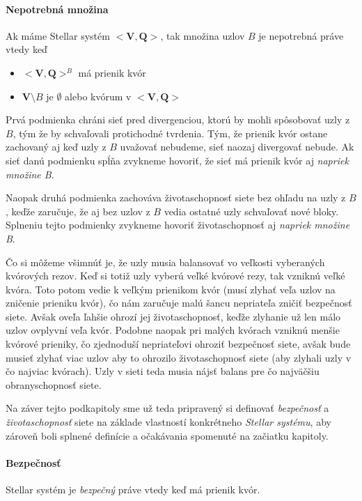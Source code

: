 \paragraph {Nepotrebná množina} Ak máme Stellar systém $<\textbf{V},
\textbf{Q}>$, tak množina uzlov $B$ je nepotrebná práve vtedy keď
\begin{itemize}
\item  $<\textbf{V}, \textbf{Q}>^B$ má prienik kvór
\item  $\textbf{V} \setminus B$ je $\pmb{\emptyset}$ alebo kvórum v $<
\textbf{V}, \textbf{Q}>$
\end{itemize}

Prvá podmienka chráni sieť pred divergenciou, ktorú by mohli spôsobovať uzly z
$B$, tým že by schvaľovali protichodné tvrdenia. Tým, že prienik kvór ostane
zachovaný aj keď uzly z $B$ uvažovať nebudeme, sieť naozaj divergovať nebude.
Ak sieť danú podmienku spĺňa zvykneme hovoriť, že sieť má prienik kvór aj
\textit{napriek množine B}.

Naopak druhá podmienka zachováva životaschopnosť siete bez ohľadu na uzly z $B$,
keďže zaručuje, že aj bez uzlov z $B$ vedia ostatné uzly schvaľovať nové bloky.
Splneniu tejto podmienky zvykneme hovoriť životaschopnosť aj
\textit{napriek množine B}.

Čo si môžeme všimnúť je, že uzly musia balansovať vo veľkosti vyberaných kvórových
rezov. Keď si totiž uzly vyberú veľké kvórové rezy, tak vzniknú veľké kvóra.
Toto potom vedie k veľkým prienikom kvór (musí zlyhať veľa uzlov na
zničenie prieniku kvór), čo nám zaručuje malú šancu nepriateľa zničiť bezpečnosť
siete. Avšak oveľa ľahšie ohrozí jej životaschopnosť, keďže zlyhanie už len
málo uzlov ovplyvní veľa kvór. Podobne naopak pri malých kvórach vzniknú menšie
kvórové prieniky, čo zjednoduší nepriateľovi ohroziť bezpečnosť siete, avšak
bude musieť zlyhať viac uzlov aby to ohrozilo životaschopnosť siete
(aby zlyhali uzly v čo najviac kvórach).
Uzly v sieti teda musia nájsť balans pre čo najväčšiu obranyschopnosť siete.

Na záver tejto podkapitoly sme už teda pripravený si definovať \textit{bezpečnosť}
a \textit{životaschopnosť} siete na základe vlastností konkrétneho
\textit{Stellar systému}, aby zároveň boli splnené definície a očakávania
spomenuté na začiatku kapitoly.

\pagebreak

\paragraph {Bezpečnosť}
Stellar systém je \textit{bezpečný} práve vtedy keď má prienik kvór.

